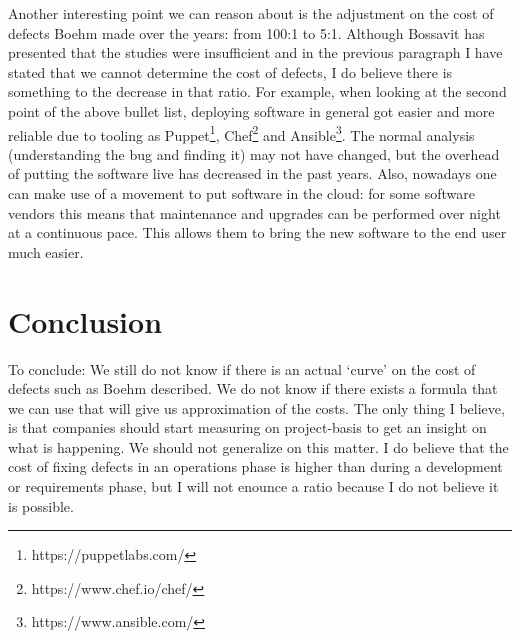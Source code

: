 Another interesting point we can reason about is the adjustment on the cost of defects Boehm made over the years: from 100:1 to 5:1.
Although Bossavit has presented that the studies were insufficient and in the previous paragraph I have stated that we cannot determine the cost of defects,
I do believe there is something to the decrease in that ratio.
For example, when looking at the second point of the above bullet list, deploying software in general got easier and more reliable due to tooling as Puppet\footnote{https://puppetlabs.com/}, Chef\footnote{https://www.chef.io/chef/} and Ansible\footnote{https://www.ansible.com/}.
The normal analysis (understanding the bug and finding it) may not have changed, but the overhead of putting the software live has decreased in the past years.
Also, nowadays one can make use of a movement to put software in the cloud: for some software vendors this means that maintenance and upgrades can be performed over night at a continuous pace.
This allows them to bring the new software to the end user much easier.

\section*{Conclusion}

To conclude: We still do not know if there is an actual `curve' on the cost of defects such as Boehm described.
We do not know if there exists a formula that we can use that will give us approximation of the costs.
The only thing I believe, is that companies should start measuring on project-basis to get an insight on what is happening.
We should not generalize on this matter.
I do believe that the cost of fixing defects in an operations phase is higher than during a development or requirements phase,
but I will not enounce a ratio because I do not believe it is possible.